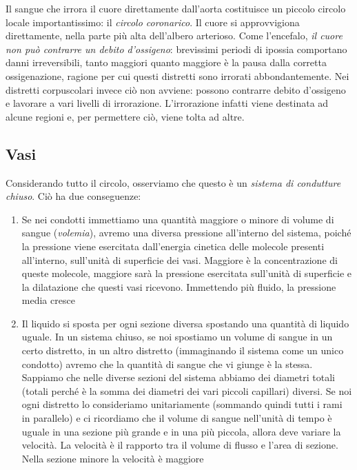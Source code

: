 \documentclass[a4paper,12pt]{article}
\begin{document}
Il sangue che irrora il cuore direttamente dall'aorta costituisce un piccolo circolo locale importantissimo: il \emph{circolo coronarico}. Il cuore si approvvigiona direttamente, nella parte più alta dell'albero arterioso. Come l'encefalo, \emph{il cuore non può contrarre un debito d'ossigeno}: brevissimi periodi di ipossia comportano danni irreversibili, tanto maggiori quanto maggiore è la pausa dalla corretta ossigenazione, ragione per cui questi distretti sono irrorati abbondantemente. Nei distretti corpuscolari invece ciò non avviene: possono contrarre debito d'ossigeno e lavorare a vari livelli di irrorazione. L'irrorazione infatti viene destinata ad alcune regioni e, per permettere ciò, viene tolta ad altre.

\subsection{Vasi}
Considerando tutto il circolo, osserviamo che questo è un \emph{sistema di condutture chiuso}. Ciò ha due conseguenze:
\begin{enumerate}
\item{Se nei condotti immettiamo una quantità maggiore o minore di volume di sangue (\emph{volemia}), avremo una diversa pressione all'interno del sistema, poiché la pressione viene esercitata dall'energia cinetica delle molecole presenti all'interno, sull'unità di superficie dei vasi. Maggiore è la concentrazione di queste molecole, maggiore sarà la pressione esercitata sull'unità di superficie e la dilatazione che questi vasi ricevono. Immettendo più fluido, la pressione media cresce}
\item{Il liquido si sposta per ogni sezione diversa spostando una quantità di liquido uguale. In un sistema chiuso, se noi spostiamo un volume di sangue in un certo distretto, in un altro distretto (immaginando il sistema come un unico condotto) avremo che la quantità di sangue che vi giunge è la stessa. Sappiamo che nelle diverse sezioni del sistema abbiamo dei diametri totali (totali perché è la somma dei diametri dei vari piccoli capillari) diversi. Se noi ogni distretto lo consideriamo unitariamente (sommando quindi tutti i rami in parallelo) e ci ricordiamo che il volume di sangue nell'unità di tempo è uguale in una sezione più grande e in una più piccola, allora deve variare la velocità. La velocità è il rapporto tra il volume di flusso e l'area di sezione. Nella sezione minore la velocità è maggiore}
\end{enumerate}
\end{document}
